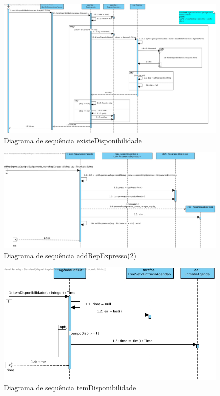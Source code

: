 \documentclass[../relatorio.tex]{subfiles}
\begin{document}
\begin{figure}[!ht]
    \centering
    \includegraphics[scale=0.45]{../assets/diagramas_sequencia/sd-existeDisponibilidade.jpg}
    \caption{Diagrama de sequência existeDisponibilidade}
\end{figure}

\begin{figure}[!ht]
    \centering
    \includegraphics[scale=0.45]{../assets/diagramas_sequencia/sd-addRepExpresso(2).jpg}
    \caption{Diagrama de sequência addRepExpresso(2)}
\end{figure}

\begin{figure}[!ht]
    \centering
    \includegraphics[scale=0.45]{../assets/diagramas_sequencia/sd-temDisponibilidade.jpg}
    \caption{Diagrama de sequência temDisponibilidade}
\end{figure}
    
\end{document}
